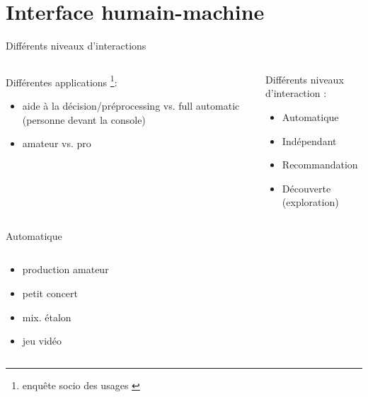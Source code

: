 \documentclass[9pt, aspectratio=169]{beamer}
\begin{document}
\section{Interface humain-machine}
\begin{frame}{Différents niveaux d'interactions} %
\begin{columns}
    \begin{column}{0.48\textwidth}
		Différentes applications \footnote{enquête socio des usages \cite{vanka_adoption_2023}}:
		\begin{itemize}
			\item aide à la décision/préprocessing vs. full automatic (personne devant la console)
			\item amateur vs. pro
		\end{itemize}

    \end{column}
    \begin{column}{0.48\textwidth}
		Différents niveaux d'interaction :
		\begin{itemize}
			\item Automatique
			\item Indépendant
			\item Recommandation
			\item Découverte (exploration)
		\end{itemize}
    \end{column}
\end{columns}
\end{frame}

\begin{frame}{Automatique} %
\begin{columns}
    \begin{column}{0.48\textwidth}
		\begin{itemize}
			\item production amateur
			\item petit concert
			\item mix. étalon
			\item jeu vidéo \cite{schmidt_interactive_2003}
		\end{itemize}
    \end{column}
    \begin{column}{0.48\textwidth}
    \end{column}
\end{columns}
\end{frame}
\end{document}
